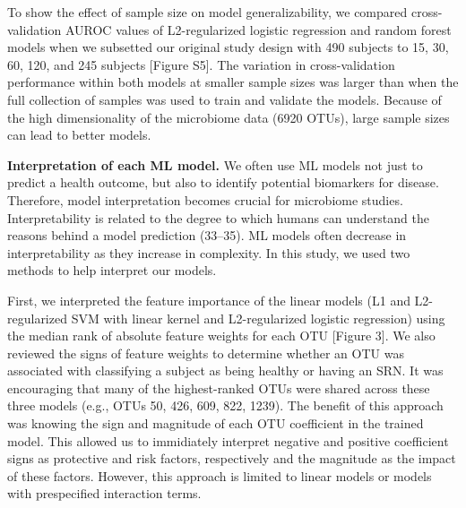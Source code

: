 \documentclass[
  11pt,
]{article}
\begin{document}
To show the effect of sample size on model generalizability, we compared
cross-validation AUROC values of L2-regularized logistic regression and
random forest models when we subsetted our original study design with
490 subjects to 15, 30, 60, 120, and 245 subjects {[}Figure S5{]}. The
variation in cross-validation performance within both models at smaller
sample sizes was larger than when the full collection of samples was
used to train and validate the models. Because of the high
dimensionality of the microbiome data (6920 OTUs), large sample sizes
can lead to better models.

\textbf{Interpretation of each ML model.} We often use ML models not
just to predict a health outcome, but also to identify potential
biomarkers for disease. Therefore, model interpretation becomes crucial
for microbiome studies. Interpretability is related to the degree to
which humans can understand the reasons behind a model prediction
(33--35). ML models often decrease in interpretability as they increase
in complexity. In this study, we used two methods to help interpret our
models.

First, we interpreted the feature importance of the linear models (L1
and L2-regularized SVM with linear kernel and L2-regularized logistic
regression) using the median rank of absolute feature weights for each
OTU {[}Figure 3{]}. We also reviewed the signs of feature weights to
determine whether an OTU was associated with classifying a subject as
being healthy or having an SRN. It was encouraging that many of the
highest-ranked OTUs were shared across these three models (e.g., OTUs
50, 426, 609, 822, 1239). The benefit of this approach was knowing the
sign and magnitude of each OTU coefficient in the trained model. This
allowed us to immidiately interpret negative and positive coefficient
signs as protective and risk factors, respectively and the magnitude as
the impact of these factors. However, this approach is limited to linear
models or models with prespecified interaction terms.
\end{document}
